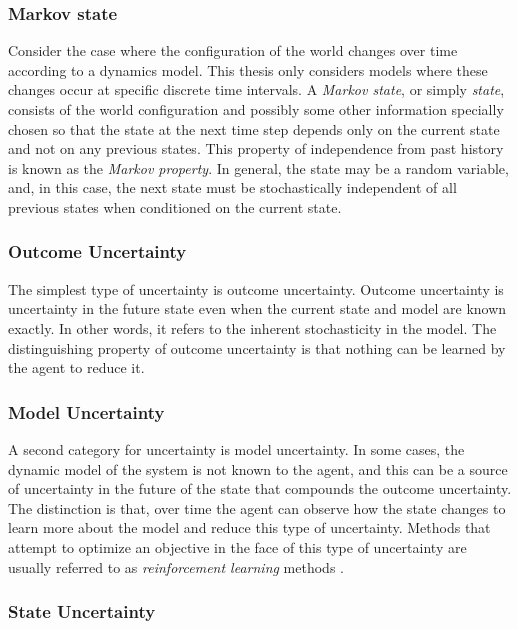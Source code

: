 \subsubsection{Markov state}

Consider the case where the configuration of the world changes over time according to a dynamics model.
This thesis only considers models where these changes occur at specific discrete time intervals.
A \emph{Markov state}, or simply \emph{state}, consists of the world configuration and possibly some other information specially chosen so that the state at the next time step depends only on the current state and not on any previous states.
This property of independence from past history is known as the \emph{Markov property}.
In general, the state may be a random variable, and, in this case, the next state must be stochastically independent of all previous states when conditioned on the current state.

\subsubsection{Outcome Uncertainty}

The simplest type of uncertainty is outcome uncertainty.
Outcome uncertainty is uncertainty in the future state even when the current state and model are known exactly.
In other words, it refers to the inherent stochasticity in the model.
The distinguishing property of outcome uncertainty is that nothing can be learned by the agent to reduce it.

\subsubsection{Model Uncertainty}

A second category for uncertainty is model uncertainty.
In some cases, the dynamic model of the system is not known to the agent, and this can be a source of uncertainty in the future of the state that compounds the outcome uncertainty.
The distinction is that, over time the agent can observe how the state changes to learn more about the model and reduce this type of uncertainty.
Methods that attempt to optimize an objective in the face of this type of uncertainty are usually referred to as \emph{reinforcement learning} methods \cite{RSS-AGB:98}.

\subsubsection{State Uncertainty}


